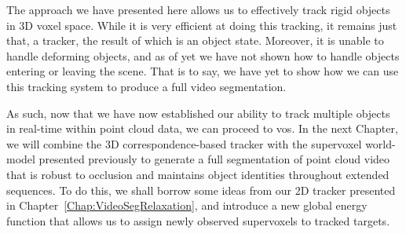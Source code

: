 The approach we have presented here allows us to effectively track rigid objects in 3D voxel space. While it is very efficient at doing this tracking, it remains just that, a tracker, the result of which is an object state. Moreover, it is unable to handle deforming objects, and as of yet we have not shown how to handle objects entering or leaving the scene. That is to say, we have yet to show how we can use this tracking system to produce a full video segmentation.

As such, now that we have now established our ability to track multiple objects in real-time within point cloud data, we can proceed to \gls{vos}. In the next Chapter, we will combine the 3D correspondence-based tracker with the supervoxel world-model presented previously to generate a full segmentation of point cloud video that is robust to occlusion and maintains object identities throughout extended sequences. To do this, we shall borrow some ideas from our 2D tracker presented in Chapter~\ref{Chap:VideoSegRelaxation}, and introduce a new global energy function that allows us to assign newly observed supervoxels to tracked targets.

